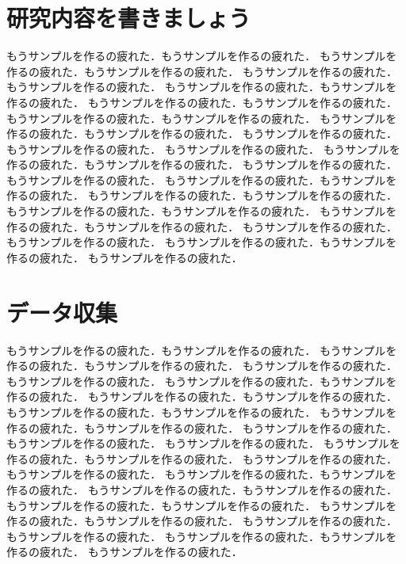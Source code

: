 %
%
\section{研究内容を書きましょう}
もうサンプルを作るの疲れた．もうサンプルを作るの疲れた．
もうサンプルを作るの疲れた．もうサンプルを作るの疲れた．
もうサンプルを作るの疲れた．もうサンプルを作るの疲れた．
もうサンプルを作るの疲れた．もうサンプルを作るの疲れた．
もうサンプルを作るの疲れた．もうサンプルを作るの疲れた．
もうサンプルを作るの疲れた．もうサンプルを作るの疲れた．
もうサンプルを作るの疲れた．もうサンプルを作るの疲れた．
もうサンプルを作るの疲れた．もうサンプルを作るの疲れた．
もうサンプルを作るの疲れた．
もうサンプルを作るの疲れた．もうサンプルを作るの疲れた．
もうサンプルを作るの疲れた．もうサンプルを作るの疲れた．
もうサンプルを作るの疲れた．もうサンプルを作るの疲れた．
もうサンプルを作るの疲れた．もうサンプルを作るの疲れた．
もうサンプルを作るの疲れた．もうサンプルを作るの疲れた．
もうサンプルを作るの疲れた．もうサンプルを作るの疲れた．
もうサンプルを作るの疲れた．もうサンプルを作るの疲れた．
もうサンプルを作るの疲れた．もうサンプルを作るの疲れた．
もうサンプルを作るの疲れた．

\section{データ収集}
もうサンプルを作るの疲れた．もうサンプルを作るの疲れた．
もうサンプルを作るの疲れた．もうサンプルを作るの疲れた．
もうサンプルを作るの疲れた．もうサンプルを作るの疲れた．
もうサンプルを作るの疲れた．もうサンプルを作るの疲れた．
もうサンプルを作るの疲れた．もうサンプルを作るの疲れた．
もうサンプルを作るの疲れた．もうサンプルを作るの疲れた．
もうサンプルを作るの疲れた．もうサンプルを作るの疲れた．
もうサンプルを作るの疲れた．もうサンプルを作るの疲れた．
もうサンプルを作るの疲れた．
もうサンプルを作るの疲れた．もうサンプルを作るの疲れた．
もうサンプルを作るの疲れた．もうサンプルを作るの疲れた．
もうサンプルを作るの疲れた．もうサンプルを作るの疲れた．
もうサンプルを作るの疲れた．もうサンプルを作るの疲れた．
もうサンプルを作るの疲れた．もうサンプルを作るの疲れた．
もうサンプルを作るの疲れた．もうサンプルを作るの疲れた．
もうサンプルを作るの疲れた．もうサンプルを作るの疲れた．
もうサンプルを作るの疲れた．もうサンプルを作るの疲れた．
もうサンプルを作るの疲れた．

